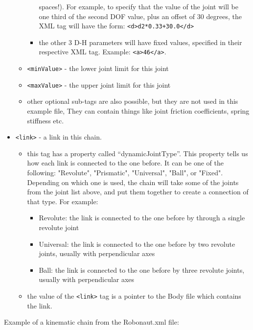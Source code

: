 \begin{itemize}
\begin{itemize}
\begin{itemize}
        spaces!). For example, to specify that the value of the joint
        will be one third of the second DOF value, plus an offset of
        30 degrees, the XML tag will have the form:
        \texttt{\texttt{<d>}d2*0.33+30.0\texttt{</d>}}
      \item the other 3 D-H parameters will have fixed values,
        specified in their respective XML tag. Example:
        \texttt{\texttt{<a>}46\texttt{</a>}}.
    \end{itemize}
    \item \texttt{<minValue>} - the lower joint limit for this joint
    \item \texttt{<maxValue>} - the upper joint limit for this joint
    \item other optional sub-tags are also possible, but they are not
      used in this example file, They can contain things like joint
      friction coefficients, spring stiffness etc.
  \end{itemize}
\item \texttt{<link>} - a link in this chain.
  \begin{itemize}
    \item this tag has a property called ``dynamicJointType''. This
      property tells us how each link is connected to the one
      before. It can be one of the following: "Revolute", "Prismatic",
      "Universal", "Ball", or "Fixed". Depending on which one is used,
      the chain will take some of the joints from the joint list
      above, and put them together to create a connection of that
      type. For example:
    \begin{itemize}
      \item Revolute: the link is connected to the one before by
        through a single revolute joint
      \item Universal: the link is connected to the one before by two
        revolute joints, usually with perpendicular axes
      \item Ball: the link is connected to the one before by three
        revolute joints, usually with perpendicular axes
    \end{itemize}
    \item the value of the \texttt{<link>} tag is a pointer to the Body file
      which contains the link.
  \end{itemize}
\end{itemize}

Example of a kinematic chain from the Robonaut.xml file:

